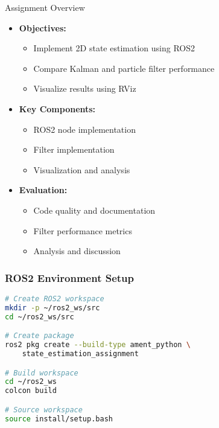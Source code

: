 \documentclass[aspectratio=169]{beamer}
\begin{document}
\begin{frame}{Assignment Overview}
    \begin{itemize}
        \item<1-> \textbf{Objectives:}
            \begin{itemize}
                \item Implement 2D state estimation using ROS2
                \item Compare Kalman and particle filter performance
                \item Visualize results using RViz
            \end{itemize}
        \item<2-> \textbf{Key Components:}
            \begin{itemize}
                \item ROS2 node implementation
                \item Filter implementation
                \item Visualization and analysis
            \end{itemize}
        \item<3-> \textbf{Evaluation:}
            \begin{itemize}
                \item Code quality and documentation
                \item Filter performance metrics
                \item Analysis and discussion
            \end{itemize}
    \end{itemize}
\end{frame}

\begin{frame}[fragile]
\frametitle{ROS2 Environment Setup}
\begin{lstlisting}[language=bash]
# Create ROS2 workspace
mkdir -p ~/ros2_ws/src
cd ~/ros2_ws/src

# Create package
ros2 pkg create --build-type ament_python \
    state_estimation_assignment

# Build workspace
cd ~/ros2_ws
colcon build

# Source workspace
source install/setup.bash
\end{lstlisting}
\end{frame}
\end{document}
